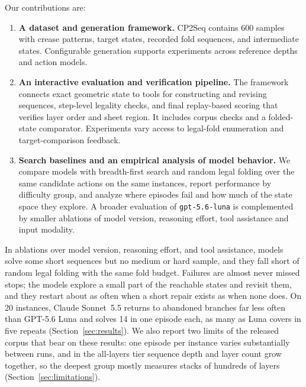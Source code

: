 Our contributions are:
\begin{enumerate}
\item \textbf{A dataset and generation framework.} CP2Seq contains 600 samples with
  crease patterns, target states, recorded fold sequences, and intermediate states. Configurable
  generation supports experiments across reference depths and action models.
\item \textbf{An interactive evaluation and verification pipeline.} The framework connects exact
  geometric state to tools for constructing and revising sequences, step-level legality
  checks, and final replay-based scoring that verifies layer order and sheet region. It includes corpus checks and a folded-state comparator.
  Experiments vary access to legal-fold enumeration and target-comparison feedback.
\item \textbf{Search baselines and an empirical analysis of model behavior.} We compare models
  with breadth-first search and random legal folding over the same candidate actions on the same
  instances, report performance by difficulty group, and analyze where episodes fail and how
  much of the state space they explore. A broader evaluation of \texttt{gpt-5.6-luna}
  is complemented by smaller ablations of model version, reasoning effort, tool assistance and
  input modality.
\end{enumerate}

In ablations over model version, reasoning effort, and tool assistance, models solve some
short sequences but no medium or hard sample, and they fall short of random legal folding with
the same fold budget. Failures are almost never missed stops; the models explore a small part of
the reachable states and revisit them, and they restart about as often when a short repair exists
as when none does. On 20 instances, Claude Sonnet~5.5 returns to abandoned branches far less often
than GPT-5.6 Luna and solves 14 in one episode each, as many as Luna covers in five repeats
(Section~\ref{sec:results}). We also report two limits of
the released corpus that bear on these results: one episode per instance varies substantially
between runs, and in the all-layers tier sequence depth and layer count grow together, so the
deepest group mostly measures stacks of hundreds of layers (Section~\ref{sec:limitations}).
